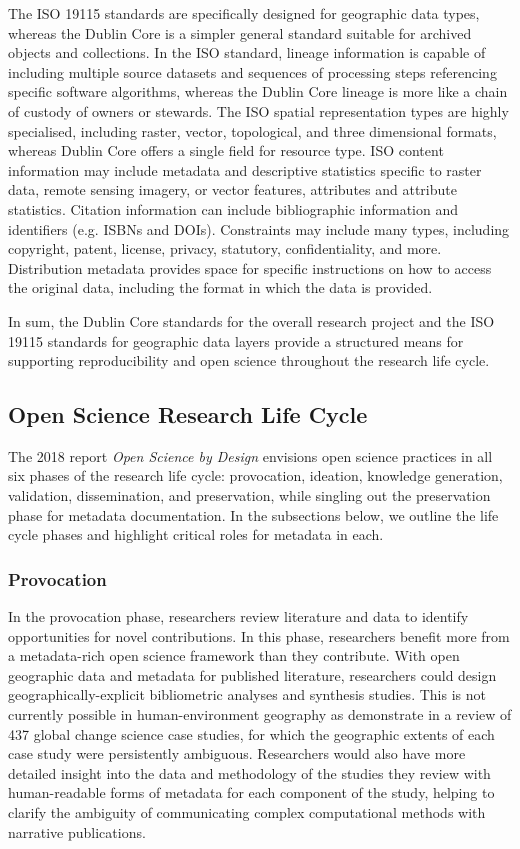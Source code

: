 \documentclass{isprs} %
\begin{document}
The ISO 19115 standards are specifically designed for geographic data types, whereas the Dublin Core is a simpler general standard suitable for archived objects and collections. In the ISO standard, lineage information is capable of including multiple source datasets and sequences of processing steps referencing specific software algorithms, whereas the Dublin Core lineage is more like a chain of custody of owners or stewards. The ISO spatial representation types are highly specialised, including raster, vector, topological, and three dimensional formats, whereas Dublin Core offers a single field for resource type. ISO content information may include metadata and descriptive statistics specific to raster data, remote sensing imagery, or vector features, attributes and attribute statistics. Citation information can include bibliographic information and identifiers (e.g. ISBNs and DOIs). Constraints may include many types, including copyright, patent, license, privacy, statutory, confidentiality, and more. Distribution metadata provides space for specific instructions on how to access the original data, including the format in which the data is provided.

In sum, the Dublin Core standards for the overall research project and the ISO 19115 standards for geographic data layers provide a structured means for supporting reproducibility and open science throughout the research life cycle.

\subsection{Open Science Research Life Cycle}\label{sec:lifecycle}

The 2018 \citeauthor{NASEM2018} report \textit{Open Science by Design} envisions open science practices in all six phases of the research life cycle: provocation, ideation, knowledge generation, validation, dissemination, and preservation, while singling out the preservation phase for metadata documentation.
In the subsections below, we outline the life cycle phases and highlight critical roles for metadata in each.

\subsubsection{Provocation}

In the provocation phase, researchers review literature and data to identify opportunities for novel contributions.
In this phase, researchers benefit more from a metadata-rich open science framework than they contribute.
With open geographic data and metadata for published literature, researchers could design geographically-explicit bibliometric analyses and synthesis studies.
This is not currently possible in human-environment geography as \citet{Margulies2016} demonstrate in a review of 437 global change science case studies, for which the geographic extents of each case study were persistently ambiguous. 
Researchers would also have more detailed insight into the data and methodology of the studies they review with human-readable forms of metadata for each component of the study, helping to clarify the ambiguity of communicating complex computational methods with narrative publications.
\end{document}
